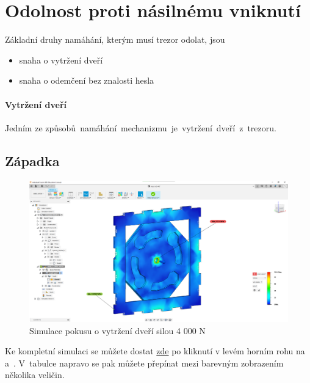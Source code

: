 \newpage

\section{Odolnost proti násilnému vniknutí}
Základní druhy namáhání, kterým musí trezor odolat, jsou

\begin{itemize}
    \item snaha o vytržení dveří 
    \item snaha o odemčení bez znalosti hesla
\end{itemize}

\paragraph{Vytržení dveří}
Jedním ze způsobů~namáhání~mechanizmu~je~vytržení~dveří~z~trezoru.

\subsection{Západka}

\begin{figure}[htbp]
    \centering
    \includegraphics[width=\textwidth]{kapitoly/obrazky/M3/simulace/odolnost_proti_vytrzeni_4kN.png}
    \caption{Simulace pokusu o vytržení dveří silou 4 000 N}
    \label{fig:M3-simulace-vytrzeni}
\end{figure}
Ke kompletní simulaci se můžete dostat \href{https://myhub.autodesk360.com/ue2d7aa41/g/shares/SH56a43QTfd62c1cd96843f1e03a0eb48053?viewState=NoIgbgDAdAjCA0IDeAdEAXAngBwKZoC40BlASwFsBXAGwEN1SB7AOzXjVoGdPd1C0ARjABsATlEQItALQBjcbmkAWCMIjSBuWgA5lAM22ilAVgAmMAOyy9\%2BBGkYCAVrlnoAkqcIBmAL4gAukA}{zde}
\parencite{simulase_mechnické} po kliknutí v levém horním rohu na  a~. V~tabulce napravo se pak můžete přepínat mezi barevným zobrazením několika veličin.
\newpage

